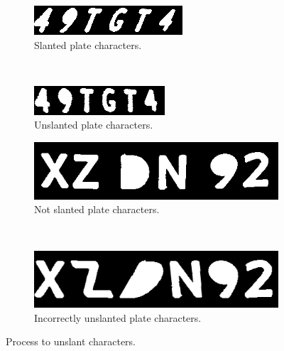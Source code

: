 \begin{figure}[ht]
        \centering
        \begin{subfigure}{0.33\textwidth}
            \includegraphics[width=\textwidth]{plaatjes/slanted-plate}
            \caption{Slanted plate characters.}
            \label{fig:slanted-plate}
        \end{subfigure}%
        ~ 
        \begin{subfigure}{0.33\textwidth}
            \includegraphics[width=\textwidth]{plaatjes/unslanted-plate}
            \caption{Unslanted plate characters.}
            \label{fig:unslanted-plate}
        \end{subfigure}%

        \begin{subfigure}{0.33\textwidth}
            \includegraphics[width=\textwidth]{plaatjes/plate-no-slant}
            \caption{Not slanted plate characters.}
            \label{fig:not-slanted-plate}
        \end{subfigure}%
        ~ 
        \begin{subfigure}{0.33\textwidth}
            \includegraphics[width=\textwidth]{plaatjes/unslanted-incorrectly}
            \caption{Incorrectly unslanted plate characters.}
            \label{fig:incorrectly-unslanted-plate}
        \end{subfigure}%

        \caption{Process to unslant characters.}
        \label{fig:unslanting-plate}
\end{figure}